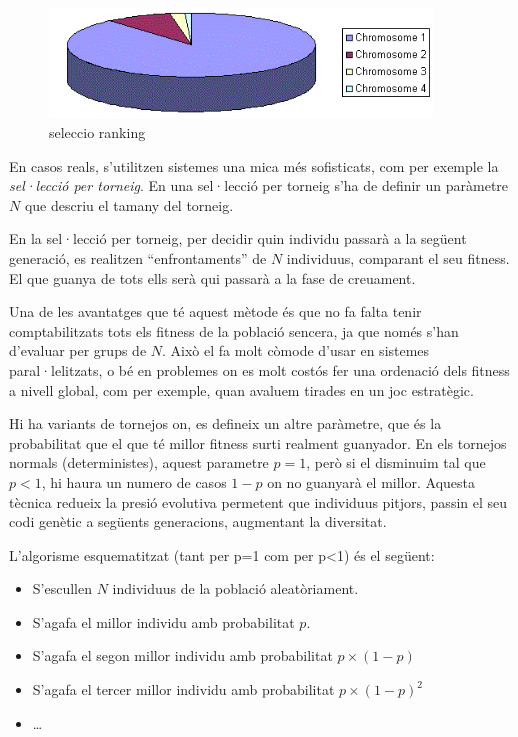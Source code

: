 \begin{figure} \centering \includegraphics[width=4in]{intro/rank1.png}
\caption{\label{fig:rank1}seleccio ranking}
\end{figure}

En casos reals, s'utilitzen sistemes una mica més sofisticats, com per exemple
la \emph{sel·lecció per torneig}.  En una sel·lecció per torneig s'ha de definir
un paràmetre $N$ que descriu el tamany del torneig.

En la sel·lecció per torneig, per decidir quin individu passarà a la següent
generació, es realitzen ``enfrontaments'' de $N$ individuus, comparant el seu
fitness.  El que guanya de tots ells serà qui passarà a la fase de creuament.

Una de les avantatges que té aquest mètode és que no fa falta tenir
comptabilitzats tots els fitness de la població sencera, ja que només s'han
d'evaluar per grups de $N$.  Això el fa molt còmode d'usar en sistemes
paral·lelitzats, o bé en problemes on es molt costós fer una ordenació dels
fitness a nivell global, com per exemple, quan avaluem tirades en un joc
estratègic.

Hi ha variants de tornejos on, es defineix un altre paràmetre, que és la
probabilitat que el que té millor fitness surti realment guanyador.  En els
tornejos normals (deterministes), aquest parametre $p=1$, però si el disminuim
tal que $p<1$, hi haura un numero de casos $1-p$ on no guanyarà el millor.
Aquesta tècnica redueix la presió evolutiva permetent que individuus pitjors,
passin el seu codi genètic a següents generacions, augmentant la diversitat.

L'algorisme esquematitzat (tant per p=1 com per p<1) és el següent:

\begin{itemize}
	\item S'escullen $N$ individuus de la població aleatòriament.
	\item S'agafa el millor individu amb probabilitat $p$.
	\item S'agafa el segon millor individu amb probabilitat $p \times (1-p)$
	\item S'agafa el tercer millor individu amb probabilitat $p \times (1-p)^2$
	\item \ldots
\end{itemize}


